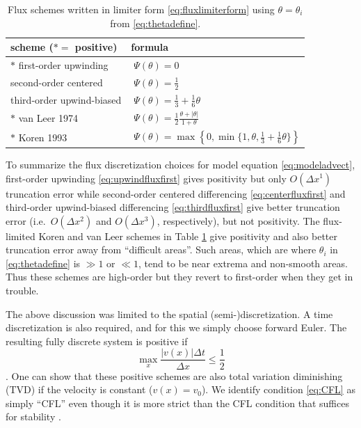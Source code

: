 \documentclass[11pt,final]{amsart}
\begin{document}
\begin{table}[ht]
  \centering
  \caption{Flux schemes written in limiter form \eqref{eq:fluxlimiterform} using $\theta=\theta_i$ from \eqref{eq:thetadefine}.}
  \begin{tabular}{ll}
    \textbf{scheme ($\ast=$ positive)} & \textbf{formula} \\
\hline
    $\ast$ first-order upwinding               & $\phantom{\Big|}\Psi(\theta) = 0$ \\
    \phantom{$\ast$} second-order centered     & $\phantom{\Big|}\Psi(\theta) = \frac{1}{2}$  \\
    \phantom{$\ast$} third-order upwind-biased & $\phantom{\Big|}\Psi(\theta) = \frac{1}{3}+\frac{1}{6} \theta$  \\
    $\ast$ van Leer 1974                       & $\phantom{\Big|}\Psi(\theta) = \frac{1}{2} \frac{\theta + |\theta|}{1+\theta}$  \\
    $\ast$ Koren 1993                          & $\phantom{\Big|}\Psi(\theta) = \max\left\{0,\min\{1,\theta,\frac{1}{3}+\frac{1}{6} \theta\}\right\}$  \\
    \hline
  \end{tabular}
 \label{tab:fluxlimiters}
\end{table}

To summarize the flux discretization choices for model equation \eqref{eq:modeladvect}, first-order upwinding \eqref{eq:upwindfluxfirst} gives positivity but only $O(\Delta x^1)$ truncation error while second-order centered differencing \eqref{eq:centerfluxfirst} and third-order upwind-biased differencing \eqref{eq:thirdfluxfirst} give better truncation error (i.e.~$O(\Delta x^2)$ and $O(\Delta x^3)$, respectively), but not positivity.  The flux-limited Koren and van Leer schemes in Table \ref{tab:fluxlimiters} give positivity and also better truncation error away from ``difficult areas''.  Such areas, which are where $\theta_i$ in \eqref{eq:thetadefine} is $\gg 1$ or $\ll 1$, tend to be near extrema and non-smooth areas.  Thus these schemes are high-order but they revert to first-order when they get in trouble.

The above discussion was limited to the spatial (semi-)discretization.  A time discretization is also required, and for this we simply choose forward Euler.  The resulting fully discrete system is positive if
\begin{equation}
\max_x \frac{|v(x)|\Delta t}{\Delta x} \le \frac{1}{2} \label{eq:CFL}
\end{equation}
\citep[section III.1.1]{HundsdorferVerwer2010}.  One can show that these positive schemes are also total variation diminishing (TVD) if the velocity is constant ($v(x)=v_0$).  We identify condition \eqref{eq:CFL} as simply ``CFL'' even though it is more strict than the CFL condition that suffices for stability \citep{MortonMayers}.
\end{document}
